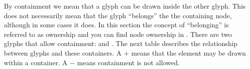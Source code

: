 By containment we mean that a glyph can be drawn inside the other glyph. This does not necessarily mean that the glyph ``belongs'' the the containing node, although in some cases it does. In this section the concept of ``belonging'' is referred to as ownership and you can find node ownership in . There are two glyphs that allow containment:  and . The next table describes the relationship between \PD glyphs and these containers. A $+$ means that the element may be drawn within a container. A $-$ means containment is not allowed.

\begin{center}
\tablelasttail{\hline}


\end{center}
